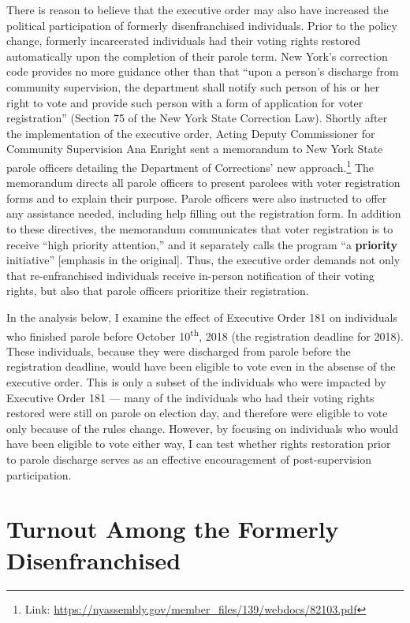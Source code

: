\documentclass[
  12pt,
]{article}
\begin{document}
There is reason to believe that the executive order may also have increased the political participation of formerly disenfranchised individuals. Prior to the policy change, formerly incarcerated individuals had their voting rights restored automatically upon the completion of their parole term. New York's correction code provides no more guidance other than that ``upon a person's discharge from community supervision, the department shall notify such person of his or her right to vote and provide such person with a form of application for voter registration'' (Section 75 of the New York State Correction Law). Shortly after the implementation of the executive order, Acting Deputy Commissioner for Community Supervision Ana Enright sent a memorandum to New York State parole officers detailing the Department of Corrections' new approach.\footnote{Link: \url{https://nyassembly.gov/member_files/139/webdocs/82103.pdf}} The memorandum directs all parole officers to present parolees with voter registration forms and to explain their purpose. Parole officers were also instructed to offer any assistance needed, including help filling out the registration form. In addition to these directives, the memorandum communicates that voter registration is to receive ``high priority attention,'' and it separately calls the program ``a \textbf{priority} initiative'' {[}emphasis in the original{]}. Thus, the executive order demands not only that re-enfranchised individuals receive in-person notification of their voting rights, but also that parole officers prioritize their registration.

In the analysis below, I examine the effect of Executive Order 181 on individuals who finished parole before October 10\textsuperscript{th}, 2018 (the registration deadline for 2018). These individuals, because they were discharged from parole before the registration deadline, would have been eligible to vote even in the absense of the executive order. This is only a subset of the individuals who were impacted by Executive Order 181 --- many of the individuals who had their voting rights restored were still on parole on election day, and therefore were eligible to vote only because of the rules change. However, by focusing on individuals who would have been eligible to vote either way, I can test whether rights restoration prior to parole discharge serves as an effective encouragement of post-supervision participation.

\hypertarget{turnout-among-the-formerly-disenfranchised}{%
\section*{Turnout Among the Formerly Disenfranchised}\label{turnout-among-the-formerly-disenfranchised}}
\end{document}
